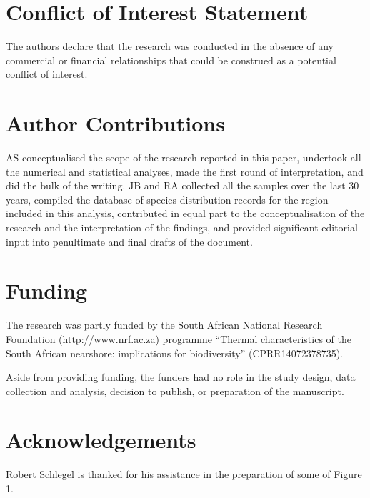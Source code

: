\documentclass[utf8]{frontiersSCNS} %
\begin{document}
\section*{Conflict of Interest Statement}
The authors declare that the research was conducted in the absence of any commercial or financial relationships that could be construed as a potential conflict of interest.

\section*{Author Contributions}

AS conceptualised the scope of the research reported in this paper, undertook all the numerical and statistical analyses, made the first round of interpretation, and did the bulk of the writing. JB and RA collected all the samples over the last 30 years, compiled the database of species distribution records for the region included in this analysis, contributed in equal part to the conceptualisation of the research and the interpretation of the findings, and provided significant editorial input into penultimate and final drafts of the document.

\section*{Funding}
The research was partly funded by the South African National Research Foundation (http://www.nrf.ac.za) programme ``Thermal characteristics of the
South African nearshore: implications for biodiversity'' (CPRR14072378735).

Aside from providing funding, the funders had no role in the study design, data collection and analysis, decision to publish, or preparation of the manuscript.

\section*{Acknowledgements}
Robert Schlegel is thanked for his assistance in the preparation of some of Figure 1.



\end{document}
